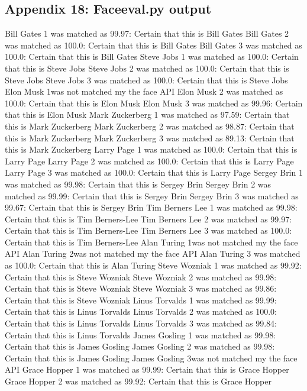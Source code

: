 \documentclass[12pt,a4paper]{article}
\begin{document}
\begin{appendices}
\section{Appendix 18: Face\textunderscore eval.py output}  
Bill Gates 1 was matched as 99.97: Certain that this is Bill Gates
Bill Gates 2 was matched as 100.0: Certain that this is Bill Gates
Bill Gates 3 was matched as 100.0: Certain that this is Bill Gates
Steve Jobs  1 was matched as 100.0: Certain that this is Steve Jobs
Steve Jobs  2 was matched as 100.0: Certain that this is Steve Jobs
Steve Jobs  3 was matched as 100.0: Certain that this is Steve Jobs
Elon Musk  1was not matched my the face API
Elon Musk  2 was matched as 100.0: Certain that this is Elon Musk
Elon Musk  3 was matched as 99.96: Certain that this is Elon Musk
Mark Zuckerberg  1 was matched as 97.59: Certain that this is Mark Zuckerberg
Mark Zuckerberg  2 was matched as 98.87: Certain that this is Mark Zuckerberg
Mark Zuckerberg  3 was matched as 89.13: Certain that this is Mark Zuckerberg
Larry Page  1 was matched as 100.0: Certain that this is Larry Page
Larry Page  2 was matched as 100.0: Certain that this is Larry Page
Larry Page  3 was matched as 100.0: Certain that this is Larry Page
Sergey Brin  1 was matched as 99.98: Certain that this is Sergey Brin
Sergey Brin  2 was matched as 99.99: Certain that this is Sergey Brin
Sergey Brin  3 was matched as 99.67: Certain that this is Sergey Brin
Tim Berners Lee  1 was matched as 99.98: Certain that this is Tim Berners-Lee
Tim Berners Lee  2 was matched as 99.97: Certain that this is Tim Berners-Lee
Tim Berners Lee  3 was matched as 100.0: Certain that this is Tim Berners-Lee
Alan Turing  1was not matched my the face API
Alan Turing  2was not matched my the face API
Alan Turing  3 was matched as 100.0: Certain that this is Alan Turing
Steve Wozniak  1 was matched as 99.92: Certain that this is Steve Wozniak
Steve Wozniak  2 was matched as 99.98: Certain that this is Steve Wozniak
Steve Wozniak  3 was matched as 99.86: Certain that this is Steve Wozniak
Linus Torvalds 1 was matched as 99.99: Certain that this is Linus Torvalds
Linus Torvalds 2 was matched as 100.0: Certain that this is Linus Torvalds
Linus Torvalds 3 was matched as 99.84: Certain that this is Linus Torvalds
James Gosling  1 was matched as 99.98: Certain that this is James Gosling
James Gosling  2 was matched as 99.98: Certain that this is James Gosling
James Gosling  3was not matched my the face API
Grace Hopper  1 was matched as 99.99: Certain that this is Grace Hopper
Grace Hopper  2 was matched as 99.92: Certain that this is Grace Hopper

\end{appendices}
\end{document}
